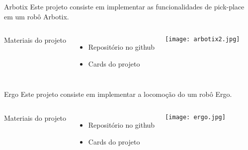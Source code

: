 \begin{frame}[t]{Arbotix} 
    Este projeto consiste em implementar as funcionalidades de pick-place em um robô Arbotix.

        \begin{columns}[c]
            Materiais do projeto
            \vspace*{0.3cm}
                \begin{itemize}
                    \item Repositório no github
                    \item Cards do projeto
                \end{itemize}
                \texttt{[image: arbotix2.jpg]}
        \end{columns}

\end{frame}
\begin{frame}[t]{Ergo} 
    Este projeto consiste em implementar a locomoção do um robô Ergo.
    \vspace*{0.3cm}
        \begin{columns}[c]
            Materiais do projeto
            \vspace*{0.3cm}
                \begin{itemize}
                    \item Repositório no github
                    \item Cards do projeto
                \end{itemize}
                \texttt{[image: ergo.jpg]}
        \end{columns}

\end{frame}

